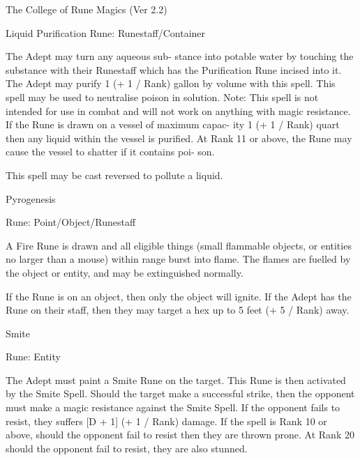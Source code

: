 \begin{Chapter}{The College of Rune Magics (Ver 2.2)}
\begin{spell}[G-5]{Liquid Purification }
Rune: Runestaff/Container 
\begin{effects}
 The  Adept  may  turn  any  aqueous  sub-
stance into potable water by touching the substance 
with  their  Runestaff  which  has  the  Purification 
Rune incised into it. The Adept may purify 1 (+ 1 / 
Rank) gallon by volume  with this spell.  This spell 
may be used to neutralise poison in solution. Note: 
This  spell  is  not  intended  for  use  in  combat  and 
will not work on anything with magic resistance. If 
the Rune is drawn on a vessel of maximum capac-
ity 1 (+ 1 / Rank) quart then any liquid within the 
vessel  is  purified.  At  Rank  11  or  above,  the  Rune 
may  cause  the  vessel  to  shatter  if  it  contains  poi-
son. 

This spell may be cast reversed to pollute a liquid. 

\end{effects}
\end{spell}

\begin{spell}[G-6]{Pyrogenesis }

Rune: Point/Object/Runestaff 
\begin{effects}
 A  Fire  Rune  is  drawn  and  all  eligible 
things  (small  flammable  objects,  or  entities  no 
larger than a mouse) within range burst into flame. 
The flames are fuelled by the object or entity, and 
may be extinguished normally. 

If  the  Rune  is  on  an  object,  then  only  the  object 
will ignite. If the Adept has the Rune on their staff, 
then they may target a hex up to 5 feet (+ 5 / Rank) 
away. 

\end{effects}
\end{spell}

\begin{spell}[G-7]{Smite }

Rune: Entity 
\begin{effects}
The Adept must paint a Smite Rune on the 
target.  This  Rune  is  then  activated  by  the  Smite 
Spell.  Should  the  target  make  a  successful  strike, 
then  the  opponent  must  make  a  magic  resistance 
against  the  Smite  Spell.  If  the  opponent  fails  to 
resist, they suffers [D + 1] (+ 1 / Rank) damage. If 
the spell is Rank 10 or above, should the opponent 
fail  to  resist  then  they  are  thrown  prone.  At  Rank 
20 should the opponent fail to resist, they are also 
stunned. 


\end{effects}
\end{spell}
\end{Chapter}
